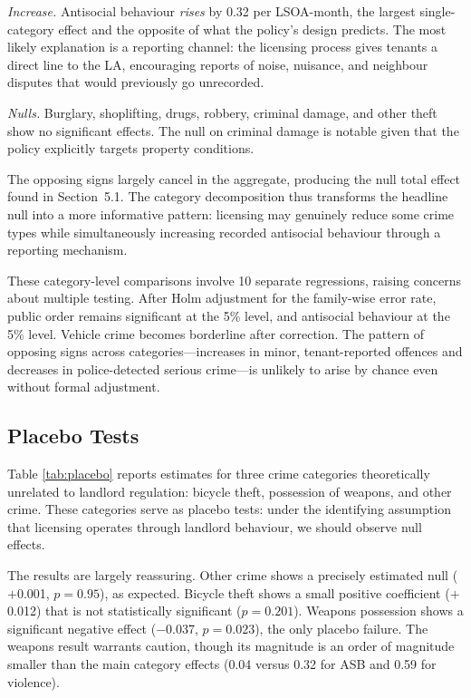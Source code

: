 \documentclass[12pt]{article}
\begin{document}
\emph{Increase.} Antisocial behaviour \emph{rises} by 0.32 per LSOA-month, the largest single-category effect and the opposite of what the policy's design predicts. The most likely explanation is a reporting channel: the licensing process gives tenants a direct line to the LA, encouraging reports of noise, nuisance, and neighbour disputes that would previously go unrecorded.

\emph{Nulls.} Burglary, shoplifting, drugs, robbery, criminal damage, and other theft show no significant effects. The null on criminal damage is notable given that the policy explicitly targets property conditions.

The opposing signs largely cancel in the aggregate, producing the null total effect found in Section~5.1. The category decomposition thus transforms the headline null into a more informative pattern: licensing may genuinely reduce some crime types while simultaneously increasing recorded antisocial behaviour through a reporting mechanism.

These category-level comparisons involve 10 separate regressions, raising concerns about multiple testing. After Holm adjustment for the family-wise error rate, public order remains significant at the 5\% level, and antisocial behaviour at the 5\% level. Vehicle crime becomes borderline after correction. The pattern of opposing signs across categories---increases in minor, tenant-reported offences and decreases in police-detected serious crime---is unlikely to arise by chance even without formal adjustment.

\subsection{Placebo Tests}



Table \ref{tab:placebo} reports estimates for three crime categories theoretically unrelated to landlord regulation: bicycle theft, possession of weapons, and other crime. These categories serve as placebo tests: under the identifying assumption that licensing operates through landlord behaviour, we should observe null effects.

The results are largely reassuring. Other crime shows a precisely estimated null ($+$0.001, $p = 0.95$), as expected. Bicycle theft shows a small positive coefficient ($+$0.012) that is not statistically significant ($p = 0.201$). Weapons possession shows a significant negative effect ($-$0.037, $p = 0.023$), the only placebo failure. The weapons result warrants caution, though its magnitude is an order of magnitude smaller than the main category effects (0.04 versus 0.32 for ASB and 0.59 for violence).
\end{document}
